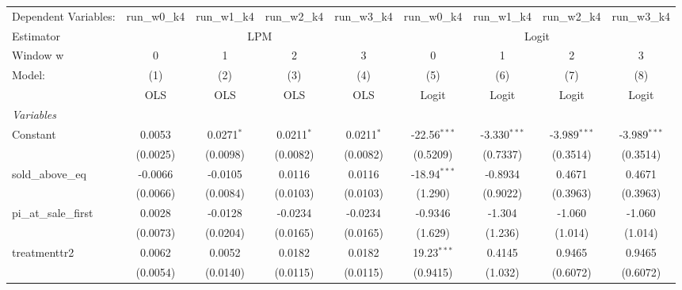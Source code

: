 \begin{tabular}{lcccccccc}
   \tabularnewline \midrule \midrule
   Dependent Variables:   & run\_w0\_k4   & run\_w1\_k4   & run\_w2\_k4   & run\_w3\_k4   & run\_w0\_k4    & run\_w1\_k4    & run\_w2\_k4    & run\_w3\_k4\\    
   Estimator & \multicolumn{4}{c}{LPM} & \multicolumn{4}{c}{Logit} \\ 
   Window w               & 0             & 1             & 2             & 3             & 0              & 1              & 2              & 3 \\   
   Model:                 & (1)           & (2)           & (3)           & (4)           & (5)            & (6)            & (7)            & (8)\\  
                          &  OLS          & OLS           & OLS           & OLS           & Logit          & Logit          & Logit          & Logit\\  
   \midrule
   \emph{Variables}\\
   Constant               & 0.0053        & 0.0271$^{*}$  & 0.0211$^{*}$  & 0.0211$^{*}$  & -22.56$^{***}$ & -3.330$^{***}$ & -3.989$^{***}$ & -3.989$^{***}$\\   
                          & (0.0025)      & (0.0098)      & (0.0082)      & (0.0082)      & (0.5209)       & (0.7337)       & (0.3514)       & (0.3514)\\   
   sold\_above\_eq        & -0.0066       & -0.0105       & 0.0116        & 0.0116        & -18.94$^{***}$ & -0.8934        & 0.4671         & 0.4671\\   
                          & (0.0066)      & (0.0084)      & (0.0103)      & (0.0103)      & (1.290)        & (0.9022)       & (0.3963)       & (0.3963)\\   
   pi\_at\_sale\_first    & 0.0028        & -0.0128       & -0.0234       & -0.0234       & -0.9346        & -1.304         & -1.060         & -1.060\\   
                          & (0.0073)      & (0.0204)      & (0.0165)      & (0.0165)      & (1.629)        & (1.236)        & (1.014)        & (1.014)\\   
   treatmenttr2           & 0.0062        & 0.0052        & 0.0182        & 0.0182        & 19.23$^{***}$  & 0.4145         & 0.9465         & 0.9465\\   
                          & (0.0054)      & (0.0140)      & (0.0115)      & (0.0115)      & (0.9415)       & (1.032)        & (0.6072)       & (0.6072)\\   

\end{tabular}
